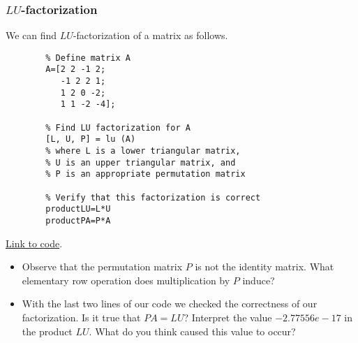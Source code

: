 \documentclass{ximera}
\begin{document}
    \subsubsection*{$LU$-factorization}
    \begin{template}\label{temp:LU}
        We can find $LU$-factorization of a matrix as follows.  
        
        \begin{verbatim}
        % Define matrix A
        A=[2 2 -1 2;
           -1 2 2 1;
           1 2 0 -2;
           1 1 -2 -4];
           
        % Find LU factorization for A   
        [L, U, P] = lu (A)
        % where L is a lower triangular matrix,
        % U is an upper triangular matrix, and
        % P is an appropriate permutation matrix
        
        % Verify that this factorization is correct
        productLU=L*U
        productPA=P*A
        \end{verbatim}
        
        \href{https://sagecell.sagemath.org/?z=eJxtjrFqwzAURXeB_-EugTbYEJtuxYOgdNLgRV1CBmHLjcCRxKtEmn59n-y0UCgC8Y507uPu8GJn5y0uJpH7hKyE7I8dOjQtuudKAOvEp92owAFN90Mtz2ieThtXYodX5ycojdmMKZD7MskFjzkQ5GocVQ1dYzihx5LxIB9L6nq2ZKHgPmCwhKslcCPj3_Ni6F6vLqJeFY8c478O_03FG-6eiZFCZC1ZcOKS01Zo0ytR3DdLbr4hnU3ii3N_u_PDGIjsmCrBy6Y8JqV7tde_OMh-2Mtvdaxh4w==&lang=octave&interacts=eJyLjgUAARUAuQ==}{Link to code}.
        
        \begin{remark}
        \begin{itemize}
        \item Observe that the permutation matrix $P$ is not the identity matrix.  What elementary row operation does multiplication by $P$ induce?
            \item With the last two lines of our code we checked the correctness of our factorization.  Is it true that $PA=LU$?  Interpret the value $-2.77556e-17$ in the product $LU$.  What do you think caused this value to occur?  
        \end{itemize}
            \end{remark}
            
        \end{template}            
\end{document}
